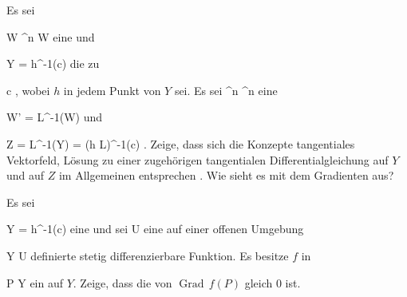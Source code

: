 {}
{

Es sei

\mavergleichskette
{\vergleichskette
{ W
}
{ \subseteq }{ \R^n
}
{  }{
}
{    }{
}
{   }{
}
}
{}{}{}
 { W } { \R
} {}
eine
und

\mavergleichskette
{\vergleichskette
{ Y
}
{ = }{ h^{-1}(c)
}
{  }{
}
{    }{
}
{   }{
}
}
{}{}{}
die
zu

\mavergleichskette
{\vergleichskette
{ c
}
{ \in }{ \R
}
{  }{
}
{    }{
}
{   }{
}
}
{}{}{,}
wobei $h$ in jedem Punkt von $Y$
sei. Es sei
 {\R^n } { \R^n
} {}
eine

\mavergleichskette
{\vergleichskette
{ W'
}
{ = }{ L^{-1}(W)
}
{  }{
}
{    }{
}
{   }{
}
}
{}{}{}
und

\mavergleichskettedisp
{\vergleichskette
{ Z
}
{ =} { L^{-1}(Y)
}
{ =} { (h \circ L)^{-1}(c)
}
{ } {
}
{ } {
}
}
{}{}{.}
Zeige, dass sich die Konzepte
tangentiales Vektorfeld, Lösung zu einer zugehörigen tangentialen Differentialgleichung  auf $Y$ und auf $Z$ im Allgemeinen entsprechen
 {} {.}
Wie sieht es mit dem Gradienten aus?

}
{} {}

{}
{

Es sei

\mavergleichskette
{\vergleichskette
{ Y
}
{ = }{ h^{-1}(c)
}
{  }{
}
{    }{
}
{   }{
}
}
{}{}{}
eine
und sei
 { U} { \R
} {}
eine auf einer offenen Umgebung

\mavergleichskette
{\vergleichskette
{ Y
}
{ \subseteq }{ U
}
{  }{
}
{    }{
}
{   }{
}
}
{}{}{}
definierte stetig differenzierbare Funktion. Es besitze $f$ in

\mavergleichskette
{\vergleichskette
{ P
}
{ \in }{ Y
}
{  }{
}
{    }{
}
{   }{
}
}
{}{}{}
ein
auf $Y$. Zeige, dass die
von $\operatorname{Grad} \,  f  (  P )$ gleich $0$ ist.

}
{} {}

